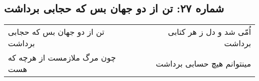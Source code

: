 \begin{center}
\section*{شماره ۲۷: تن از دو جهان بس که حجابی برداشت}
\label{sec:027}
\begin{longtable}{l p{0.5cm} r}
تن از دو جهان بس که حجابی برداشت
&&
اُمّی شد و دل ز هر کتابی برداشت
\\
چون مرگ ملازمست از هرچه که هست
&&
مینتوانم هیچ حسابی برداشت
\\
\end{longtable}
\end{center}
